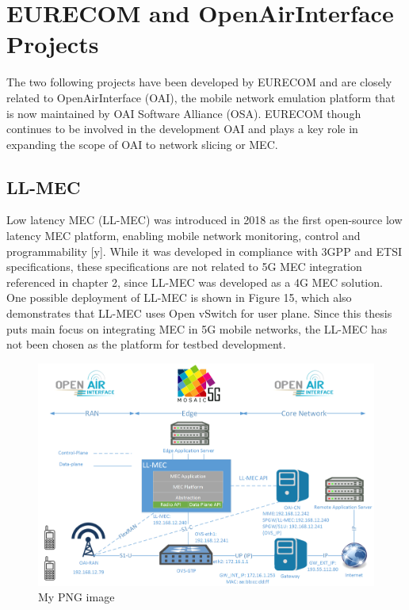 \documentclass[12pt,a4paper,twoside]{report}
\begin{document}
\section{EURECOM and OpenAirInterface Projects}
The two following projects have been developed by EURECOM and are closely related to OpenAirInterface (OAI), the mobile network emulation platform that is now maintained by OAI Software Alliance (OSA). EURECOM though continues to be involved in the development OAI and plays a key role in expanding the scope of OAI to network slicing or MEC.
\subsection{LL-MEC}
Low latency MEC (LL-MEC) was introduced in 2018 as the first open-source low latency MEC platform, enabling mobile network monitoring, control and programmability [y]. While it was developed in compliance with 3GPP and ETSI specifications, these specifications are not related to 5G MEC integration referenced in chapter 2, since LL-MEC was developed as a 4G MEC solution. One possible deployment of LL-MEC is shown in Figure 15, which also demonstrates that LL-MEC uses Open vSwitch for user plane. Since this thesis puts main focus on integrating MEC in 5G mobile networks, the LL-MEC has not been chosen as the platform for testbed development.
\begin{figure}[ht]
	\centering
	\includegraphics[width=13cm]{./images/ll-mec.png} 
	\caption{My PNG image}
\end{figure}
\end{document}
